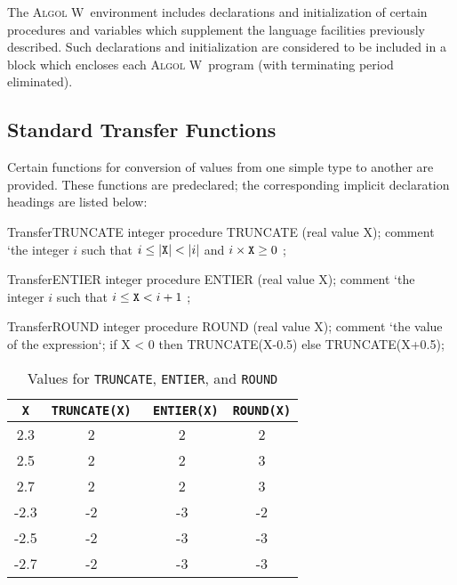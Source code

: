 \documentclass[a4paper]{article}
\def\ALGOLW{\textsc{Algol W}}
\def\A{\lstinline[language=AlgolW,style=ReferenceManual]}
\begin{document}
The \ALGOLW\ environment includes declarations and initialization of
certain procedures and variables which supplement the language
facilities previously described. Such declarations and initialization
are considered to be included in a block which encloses each \ALGOLW\
program (with terminating period eliminated).


\subsection{Standard Transfer Functions}
\label{Standard Transfer Functions}

Certain functions for conversion of values from one simple type to
another are provided. These functions are predeclared; the
corresponding implicit declaration headings are listed below:

\begin{ProcedureDeclaration}{Transfer}{TRUNCATE}
integer procedure TRUNCATE (real value X);
comment `\rm the integer $i$ such that $i \leq |{\tt X}| < |i|$ and $i\times {\tt X} \geq 0$ ;
\end{ProcedureDeclaration}

\begin{ProcedureDeclaration}{Transfer}{ENTIER}
integer procedure ENTIER (real value X);
comment `\rm the integer $i$ such that $i \leq {\tt X} < i + 1$ ;
\end{ProcedureDeclaration}

\begin{ProcedureDeclaration}{Transfer}{ROUND}
integer procedure ROUND (real value X);
comment `\rm the value of the expression`;
if X < 0 then TRUNCATE(X-0.5) else TRUNCATE(X+0.5);
\end{ProcedureDeclaration}

\begin{table}
\begin{center}
\begin{tabular}{c|c|c|c}
\A!X!  &  \A!TRUNCATE(X)!  &  \A! ENTIER(X)! &   \A!ROUND(X)! \\
\hline
  2.3  &       2       &      2      &      2 \\
  2.5  &       2       &      2      &      3 \\
  2.7  &       2       &      2      &      3 \\
 -2.3  &      -2       &     -3      &     -2 \\
 -2.5  &      -2       &     -3      &     -3 \\
 -2.7  &      -2       &     -3      &     -3
\end{tabular}
\end{center}
\caption{Values for \A!TRUNCATE!, \A!ENTIER!, and \A!ROUND!}
\end{table}
\end{document}
